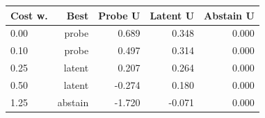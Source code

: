 \begin{tabular}{lrrrr}
\toprule
Cost w. & Best & Probe U & Latent U & Abstain U \\
\midrule
0.00 & probe & 0.689 & 0.348 & 0.000 \\
0.10 & probe & 0.497 & 0.314 & 0.000 \\
0.25 & latent & 0.207 & 0.264 & 0.000 \\
0.50 & latent & -0.274 & 0.180 & 0.000 \\
1.25 & abstain & -1.720 & -0.071 & 0.000 \\
\bottomrule
\end{tabular}
